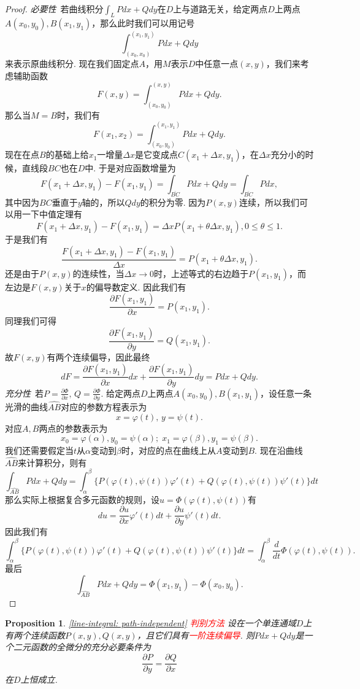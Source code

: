 \documentclass{article}
\newtheorem{proposition}[theorem]{Proposition}
\newcommand{\redt}[1]{\textcolor{red}{#1}}
\begin{document}
\begin{proof}
\rm \emph{必要性}\ 若曲线积分$\int_L Pdx + Qdy$在$D$上与道路无关，给定两点$D$上两点$A(x_0,y_0),B(x_1,y_1)$，那么此时我们可以用记号
$$
\int_{(x_0,x_0)}^{(x_1,y_1)} Pdx+Qdy
$$
来表示原曲线积分. 现在我们固定点$A$，用$M$表示$D$中任意一点$(x,y)$，我们来考虑辅助函数
$$
F(x,y) = \int_{(x_0,y_0)}^{(x,y)} Pdx+Qdy.
$$
那么当$M=B$时，我们有
$$
F(x_1,x_2) = \int_{(x_0,y_0)}^{(x_1,y_1)} Pdx+Qdy.
$$
现在在点$B$的基础上给$x_1$一增量$\Delta x$是它变成点$C(x_1+\Delta x,y_1)$，在$\Delta x$充分小的时候，直线段$BC$也在$D$中. 于是对应函数增量为
$$
F(x_1+\Delta x ,y_1)-F(x_1,y_1) = \int_{\overline{BC}}Pdx+ Qdy = \int_{\overline{BC}} Pdx,
$$ 
其中因为$BC$垂直于$y$轴的，所以$Qdy$的积分为零. 因为$P(x,y)$连续，所以我们可以用一下中值定理有
$$
F(x_1+\Delta x ,y_1)-F(x_1,y_1) = \Delta x P(x_1+\theta \Delta x,y_1),  0 \leq \theta \leq 1.
$$
于是我们有
$$
\frac{F(x_1+\Delta x ,y_1)-F(x_1,y_1)}{\Delta x} = P(x_1+\theta \Delta x, y_1).
$$
还是由于$P(x,y)$的连续性，当$\Delta x \to 0$时，上述等式的右边趋于$P(x_1,y_1)$，而左边是$F(x,y)$关于$x$的偏导数定义. 因此我们有
$$
\frac{\partial F(x_1,y_1)}{\partial x} = P(x_1,y_1). 
$$
同理我们可得
$$
\frac{\partial F(x_1,y_1)}{\partial y} = Q(x_1,y_1). 
$$
故$F(x,y)$有两个连续偏导，因此最终
$$
dF = \frac{\partial F(x_1,y_1)}{\partial x}dx + \frac{\partial F(x_1,y_1)}{\partial y}dy = Pdx +Qdy.
$$
\emph{充分性}\ 若$P=\frac{\partial \Phi}{\partial x},\,Q=\frac{\partial \Phi}{\partial y}$. 给定两点$D$上两点$A(x_0,y_0),B(x_1,y_1)$，设任意一条光滑的曲线$\widehat{AB}$对应的参数方程表示为
$$
x = \varphi(t),\, y = \psi(t).
$$
对应$A,B$两点的参数表示为
$$
x_0 = \varphi(\alpha),y_0 =\psi(\alpha);\; x_1 =\varphi(\beta), y_1 = \psi(\beta).
$$
我们还需要假定当$t$从$\alpha$变动到$\beta$时，对应的点在曲线上从$A$变动到$B$. 现在沿曲线$\widehat{AB}$来计算积分，则有
$$
\int_{\widehat{AB}}Pdx+ Qdy = \int_\alpha^\beta \{P(\varphi(t),\psi(t))\varphi'(t) + Q(\varphi(t),\psi(t))\psi'(t)\}dt
$$
那么实际上根据复合多元函数的规则，设$u = \Phi(\varphi(t),\psi(t)) $有
$$
du = \frac{\partial u}{\partial x}\varphi'(t)dt + \frac{\partial u}{\partial y}\psi'(t)dt.
$$
因此我们有
$$
\int_\alpha^\beta \{P(\varphi(t),\psi(t))\varphi'(t) + Q(\varphi(t),\psi(t))\psi'(t)\}dt = \int_\alpha^\beta \frac{d}{dt} \Phi(\varphi(t),\psi(t)).
$$
最后
$$
\int_{\widehat{AB}}Pdx+ Qdy = \Phi(x_1,y_1)-\Phi(x_0,y_0). 
$$
\end{proof}

\begin{proposition}
\rm \redt{\ref{line-integral: path-independent} 判别方法} 设在一个单连通域$D$上有两个连续函数$P(x,y),Q(x,y)$，且它们具有\redt{一阶连续偏导}. 则$Pdx + Qdy$是一个二元函数的全微分的充分必要条件为
$$
\frac{\partial P}{\partial y} = \frac{\partial Q}{\partial x}
$$
在$D$上恒成立. 
\end{proposition}
\end{document}
